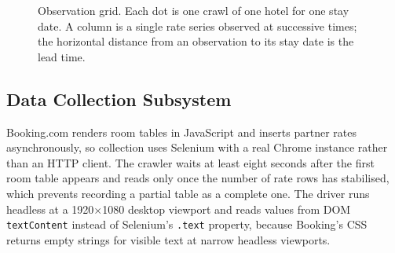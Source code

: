 \begin{figure}[H]
\centering
{}
\caption{Observation grid. Each dot is one crawl of one hotel for one stay date. A column is a single rate series observed at successive times; the horizontal distance from an observation to its stay date is the lead time.}
\label{fig:two_time}
\end{figure}

\subsection{Data Collection Subsystem}

Booking.com renders room tables in JavaScript and inserts partner rates asynchronously, so collection uses Selenium with a real Chrome instance rather than an HTTP client. The crawler waits at least eight seconds after the first room table appears and reads only once the number of rate rows has stabilised, which prevents recording a partial table as a complete one. The driver runs headless at a 1920$\times$1080 desktop viewport and reads values from DOM \texttt{textContent} instead of Selenium's \texttt{.text} property, because Booking's CSS returns empty strings for visible text at narrow headless viewports.

